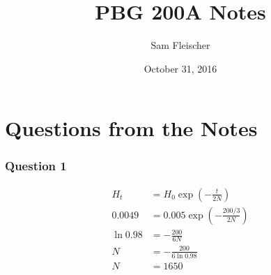 \documentclass{article}
\title{PBG 200A Notes}
\author{Sam Fleischer}
\date{October 31, 2016}
\begin{document}
    \maketitle

    \section{Questions from the Notes}
        \subsubsection*{Question 1}
            \begin{align}
                H_t &= H_0\exp(-\frac{t}{2N}) \\
                0.0049 &= 0.005\exp(-\frac{200/3}{2N}) \\
                \ln0.98 &= -\frac{200}{6N} \\
                N &= -\frac{200}{6\ln0.98} \\
                N &= 1650
            \end{align}
\end{document}

